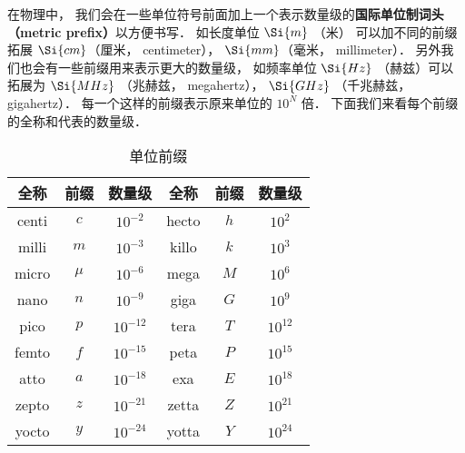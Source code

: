 
在物理中， 我们会在一些单位符号前面加上一个表示数量级的\textbf{国际单位制词头（metric prefix）}以方便书写． 如长度单位 $\Si{m}$ （米） 可以加不同的前缀拓展 $\Si{cm}$（厘米， centimeter）， $\Si{mm}$（毫米， millimeter）． 另外我们也会有一些前缀用来表示更大的数量级， 如频率单位 $\Si{Hz}$ （赫兹）可以拓展为 $\Si{MHz}$ （兆赫兹， megahertz）， $\Si{GHz}$ （千兆赫兹， gigahertz）． 每一个这样的前缀表示原来单位的 $10^N$ 倍． 下面我们来看每个前缀的全称和代表的数量级．

\begin{table}[ht]
\centering
\caption{单位前缀}\label{UniPre_tab1}
\begin{tabular}{|c|c|c|c|c|c|}
\hline
全称 & 前缀 & 数量级 & 全称 & 前缀 & 数量级 \\
\hline
centi & $c$ & $10^{-2}$ & hecto & $h$ & $10^2$ \\
\hline
milli & $m$ & $10^{-3}$ & killo & $k$ & $10^3$ \\
\hline
micro & $\mu$ & $10^{-6}$ & mega & $M$ & $10^6$ \\
\hline
nano & $n$ & $10^{-9}$ & giga & $G$ & $10^9$ \\
\hline
pico & $p$ & $10^{-12}$ & tera & $T$ & $10^{12}$ \\
\hline
femto & $f$ & $10^{-15}$ & peta & $P$ & $10^{15}$ \\
\hline
atto & $a$ & $10^{-18}$ & exa & $E$ & $10^{18}$ \\
\hline
zepto & $z$ & $10^{-21}$ & zetta & $Z$ & $10^{21}$ \\
\hline
yocto & $y$ & $10^{-24}$ & yotta & $Y$ & $10^{24}$ \\
\hline
\end{tabular}
\end{table}
